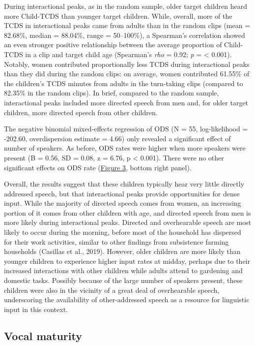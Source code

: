 \documentclass[
  english,
  ,man,floatsintext]{apa6}
\begin{document}
During interactional peaks, as in the random sample, older target children heard more Child-TCDS than younger target children. While, overall, more of the TCDS in interactional peaks came from adults than in the random clips (mean = 82.68\%, median = 88.04\%, range = 50--100\%), a Spearman's correlation showed an even stronger positive relationship between the average proportion of Child-TCDS in a clip and target child age (Spearman's \emph{rho} = 0.92; \emph{p} = \textless{} 0.001). Notably, women contributed proportionally less TCDS during interactional peaks than they did during the random clips: on average, women contributed 61.55\% of the children's TCDS minutes from adults in the turn-taking clips (compared to 82.35\% in the random clips). In brief, compared to the random sample, interactional peaks included more directed speech from men and, for older target children, more directed speech from other children.

The negative binomial mixed-effects regression of ODS (N = 55, log-likelihood = -202.60, overdispersion estimate = 4.66) only revealed a significant effect of number of speakers. As before, ODS rates were higher when more speakers were present (B = 0.56, SD = 0.08, z = 6.76, p \textless{} 0.001). There were no other significant effects on ODS rate (\protect\hyperlink{fig3}{Figure 3}, bottom right panel).

Overall, the results suggest that these children typically hear very little directly addressed speech, but that interactional peaks provide opportunities for dense input. While the majority of directed speech comes from women, an increasing portion of it comes from other children with age, and directed speech from men is more likely during interactional peaks. Directed and overhearable speech are most likely to occur during the morning, before most of the household has dispersed for their work activities, similar to other findings from subsistence farming households (Casillas et al., 2019). However, older children are more likely than younger children to experience higher input rates at midday, perhaps due to their increased interactions with other children while adults attend to gardening and domestic tasks. Possibly because of the large number of speakers present, these children were also in the vicinity of a great deal of overhearable speech, underscoring the availability of other-addressed speech as a resource for linguistic input in this context.

\hypertarget{vocal-maturity}{%
\subsection{Vocal maturity}\label{vocal-maturity}}
\end{document}

